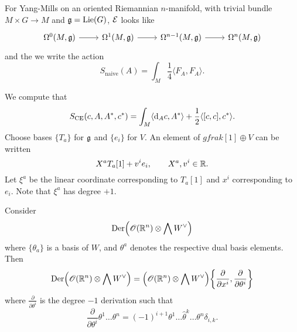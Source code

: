 For Yang-Mills on an oriented Riemannian $n$-manifold, with trivial bundle $M \times G \to M$ and $\mathfrak{g} = \operatorname{Lie} (G)$, $\mathcal{E}$ looks like
\begin{equation*}
  \begin{tikzcd}
    \Omega^0(M, \gfrak) \arrow[r] &
    \Omega^1 (M, \gfrak) \arrow[r] &
    \Omega^{n-1} (M, \gfrak) \arrow[r] &
    \Omega^n (M, \gfrak)
  \end{tikzcd}
\end{equation*}
and the we write the action
\begin{equation*}
  S_{\text{naive}} (A) = \int_M \frac{1}{4} \langle F_A, F_A \rangle.
\end{equation*}

We compute that
\begin{equation*}
  S_{\text{CE}}(c, A, A^*, c^*)
  = \int_M \langle \mathrm{d}_A c, A^* \rangle + \frac{1}{2} \langle [c, c], c^* \rangle.
\end{equation*}
Choose bases $\{ T_a \}$ for $\mathfrak{g}$ and $\{ e_i \}$ for $V$.
An element of $gfrak[1] \oplus V$ can be written
\begin{equation*}
  X^a T_a [1] + v^i e_i, \qquad  X^a, v^i \in \mathbb{R}.
\end{equation*}
Let $\xi^a$ be the linear coordinate corresponding to $T_a [1]$ and $x^i$ corresponding to $e_i$.
Note that $\xi^a$ has degree $+1$.

\begin{proposition}
  Consider
  \begin{equation*}
    \operatorname{Der} \Bigl( \mathscr{O}(\mathbb{R}^n) \otimes \bigwedge  W^{\vee} \Bigr)
  \end{equation*}
  where $\{ \theta_a \}$ is a basis of $W$, and $\theta^a$ denotes the respective dual basis elements. Then
  \begin{equation*}
    \operatorname{Der} \Bigl( \mathscr{O}(\mathbb{R}^n) \otimes \bigwedge W^{\vee} \Bigr)
    = \Bigl( \mathscr{O}(\mathbb{R}^n) \otimes \bigwedge W^{\vee} \Bigr) \biggl\{ \frac{\partial}{\partial x^i}, \frac{\partial}{\partial \theta^i} \biggr\}
  \end{equation*}
  where $\frac{\partial}{\partial \theta^i}$ is the degree $-1$ derivation such that
  \begin{equation*}
    \frac{\partial}{\partial \theta^i} \theta^{1} \dots \theta^{n}
    = (-1)^{i+1} \theta^1 \dots \hat{\theta}^k \dots \theta^n \delta_{i,k}.
   \end{equation*}
\end{proposition}

